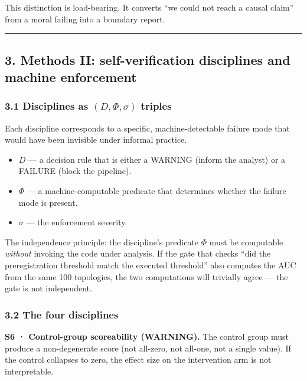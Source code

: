 \documentclass[
]{article}
\providecommand{\tightlist}{%
  \setlength{\itemsep}{0pt}\setlength{\parskip}{0pt}}
\begin{document}
This distinction is load-bearing. It converts ``we could not reach a
causal claim'' from a moral failing into a boundary report.

\begin{center}\rule{0.5\linewidth}{0.5pt}\end{center}

\subsection{3. Methods II: self-verification disciplines and machine
enforcement}\label{methods-ii-self-verification-disciplines-and-machine-enforcement}

\subsubsection{\texorpdfstring{3.1 Disciplines as \((D, \Phi, \sigma)\)
triples}{3.1 Disciplines as (D, \textbackslash Phi, \textbackslash sigma) triples}}\label{disciplines-as-d-phi-sigma-triples}

Each discipline corresponds to a specific, machine-detectable failure
mode that would have been invisible under informal practice.

\begin{itemize}
\tightlist
\item
  \textbf{\(D\)} --- a decision rule that is either a WARNING (inform
  the analyst) or a FAILURE (block the pipeline).
\item
  \textbf{\(\Phi\)} --- a machine-computable predicate that determines
  whether the failure mode is present.
\item
  \textbf{\(\sigma\)} --- the enforcement severity.
\end{itemize}

The independence principle: the discipline's predicate \(\Phi\) must be
computable \emph{without} invoking the code under analysis. If the gate
that checks ``did the preregistration threshold match the executed
threshold'' also computes the AUC from the same 100 topologies, the two
computations will trivially agree --- the gate is not independent.

\subsubsection{3.2 The four disciplines}\label{the-four-disciplines}

\textbf{S6 · Control-group scoreability (WARNING).} The control group
must produce a non-degenerate score (not all-zero, not all-one, not a
single value). If the control collapses to zero, the effect size on the
intervention arm is not interpretable.
\end{document}
